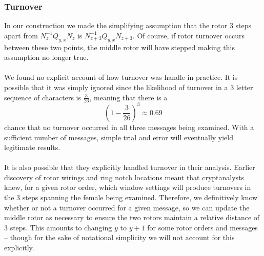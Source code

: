 \subsubsection{Turnover}
In our construction we made the simplifying assumption that the rotor
3 steps apart from $N_{z}^{-1}Q_{y,x}N_{z}$ is
$N_{z+3}^{-1}Q_{y,x}N_{z+3}$. Of course, if rotor turnover occurs
between these two points, the middle rotor will have stepped making
this assumption no longer true. 
\\\\We found no explicit account of how turnover was handle in practice. 
It is possible that it was simply ignored since the likelihood of turnover in a $3$ letter sequence of characters is $\frac{3}{26}$, meaning that there is a 
\[
(1-\frac{3}{26})^3 \approx 0.69
\]
chance that no turnover occurred in all three messages being examined. With a sufficient number of messages, simple trial and error will eventually yield legitimate results. 
\\\\It is also possible that they explicitly handled turnover in their analysis. Earlier discovery of rotor
wirings and ring notch locations meant that cryptanalysts knew, for a
given rotor order, which window settings will produce turnovers in
the $3$ steps spanning the female being examined. Therefore, we definitively know whether or
not a turnover occurred for a given message, so we can
update the middle rotor as necessary to ensure the two rotors
maintain a relative distance of 3 steps. This amounts to changing $y$
to $y+1$ for some rotor orders and messages -- though for the sake of
notational simplicity we will not account for this explicitly.
